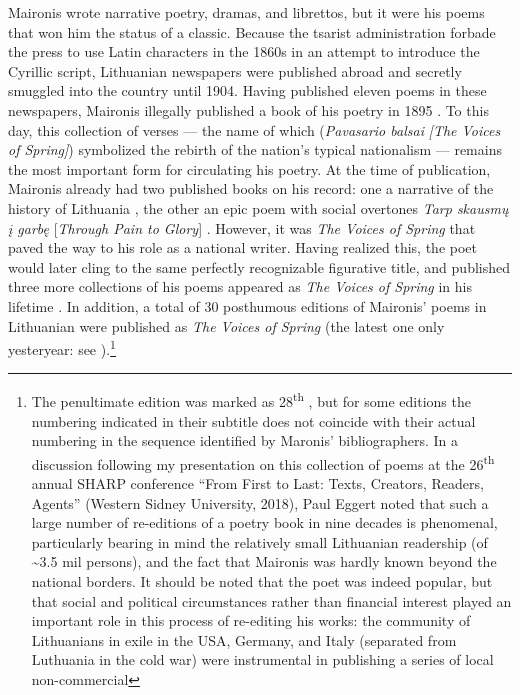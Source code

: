 \begin{paper}
Maironis wrote narrative poetry, dramas, and librettos, but it were
his poems that won him the status of a classic. Because the tsarist administration forbade the press to use Latin characters in the 1860s in an attempt to introduce the Cyrillic script, Lithuanian newspapers were published abroad and secretly smuggled into the country until 1904.
Having published eleven poems in these newspapers, Maironis
illegally published a book of his poetry in 1895 \citep{maironis_pavasario_1895}. To this day, this
collection of verses --- the name of which (\emph{Pavasario balsai} \emph{[The Voices of
Spring]}) symbolized the rebirth of the nation's typical nationalism --- remains the most important form for circulating his poetry. At the time
of publication, Maironis already had two published books on his record: one a narrative of the history of Lithuania \citep{maironis_apsakymai_1891}, the other an epic
poem with social overtones \emph{Tarp skausmų į garbę} [\emph{Through
Pain to Glory}] \citep{maironis_terp_1895}. However, it was \emph{The
Voices of Spring} that paved the way to his role as a
national writer. Having realized this, the poet would later cling to the same
perfectly recognizable figurative title, and published three more collections of
his poems appeared as \emph{The Voices of Spring} in his
lifetime \citep{maironis_pavasario_1905, maironis_pavasario_1913, maironis_pavasario_1920}. In addition, a total of 30 posthumous editions of Maironis' poems in Lithuanian were published as
\emph{The Voices of Spring} (the
latest one only yesteryear: see \citealt{maironis_pavasario_2020}).\footnote{The penultimate edition was marked as
  28\textsuperscript{th} \citep{maironis_pavasario_2012}, but for some editions the numbering indicated in
  their subtitle does not coincide with their actual
  numbering in the sequence identified by Maronis' bibliographers. In a discussion
  following my presentation on this collection of poems at the
  26\textsuperscript{th} annual SHARP conference ``From First to Last:
  Texts, Creators, Readers, Agents'' (Western Sidney University, 2018),
  Paul Eggert noted that such a large number of re-editions of a poetry
  book in nine decades is phenomenal, particularly bearing in mind the
  relatively small Lithuanian readership (of \textasciitilde{}3.5 mil
  persons), and the fact that Maironis was hardly known beyond the
  national borders. It should be noted that the poet was indeed
  popular, but that social and political circumstances rather than
  financial interest played an important role in this process of re-editing his works: the community of Lithuanians in exile in the USA, Germany, and Italy (separated from Luthuania in the cold war) were instrumental in publishing a series of local non-commercial
}
\end{paper}
